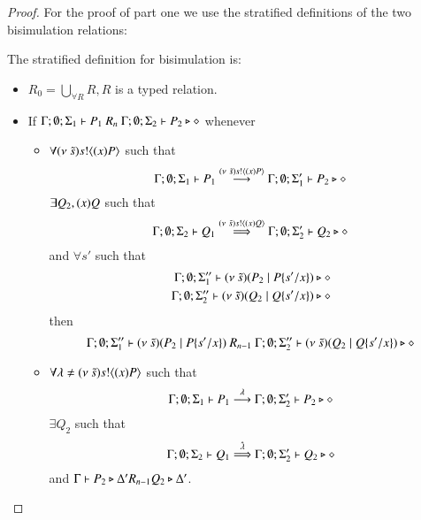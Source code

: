 \begin{proof}


	For the proof of part one we use the stratified definitions of the two bisimulation relations:

	The stratified definition for bisimulation is:

	\begin{itemize}
		\item	$R_0 = \bigcup_{\forall R} R, R$ is a typed relation.
		\item	If $\Gamma; \emptyset; \Sigma_1 \vdash P_1\ R_n\ \Gamma; \emptyset; \Sigma_2 \vdash P_2 \triangleright \diamond$
			whenever
			\begin{itemize}
				\item	$\forall (\nu\ \tilde{s}) s ! \langle (x)P \rangle$ such that
					\[
						\Gamma; \emptyset; \Sigma_1 \vdash P_1 \stackrel{(\nu\ \tilde{s}) s ! \langle (x)P \rangle}{\longrightarrow} \Gamma; \emptyset; \Sigma_1' \vdash P_2 \triangleright \diamond
					\]
					$\exists Q_2, (x)Q$ such that
					\[
						\Gamma; \emptyset; \Sigma_2 \vdash Q_1 \stackrel{(\nu\ \tilde{s}) s ! \langle (x)Q \rangle}{\Longrightarrow} \Gamma; \emptyset; \Sigma_2' \vdash Q_2 \triangleright \diamond
					\]
					and $\forall s'$
					such that
					\begin{eqnarray*}
						\Gamma; \emptyset; \Sigma_1'' \vdash (\nu\ \tilde{s})(P_2 \;|\; P \{s'/x \}) \triangleright \diamond \\
						\Gamma; \emptyset; \Sigma_2'' \vdash (\nu\ \tilde{s})(Q_2 \;|\; Q \{s'/x \}) \triangleright \diamond
					\end{eqnarray*}
					then
					\[
						\Gamma; \emptyset; \Sigma_1'' \proves \newsp{\tilde{s}}{P_2 \Par P \subst{s'}{x}}\ R_{n-1}\ 
						\Gamma; \emptyset; \Sigma_2'' \proves \newsp{\tilde{s}}{Q_2 \Par Q \subst{s'}{x}} \hastype \Proc
					\]

				\item	$\forall \lambda \not= (\nu\ \tilde{s}) s ! \langle (x)P \rangle$ such that
					\[
						\Gamma; \emptyset; \Sigma_1 \vdash P_1 \stackrel{\lambda}{\longrightarrow} \Gamma; \emptyset; \Sigma_2' \vdash P_2 \triangleright \diamond
					\]
					$\exists Q_2$ such that 
					\[
						\Gamma; \emptyset; \Sigma_2 \vdash Q_1 \stackrel{\hat{\lambda}}{\Longrightarrow} \Gamma; \emptyset; \Sigma_2' \vdash Q_2 \triangleright \diamond
					\]
					and
					$\Gamma \vdash P_2 \triangleright \Delta' R_{n-1} Q_2 \triangleright \Delta'$.


\end{itemize}
\end{itemize}
\end{proof}
